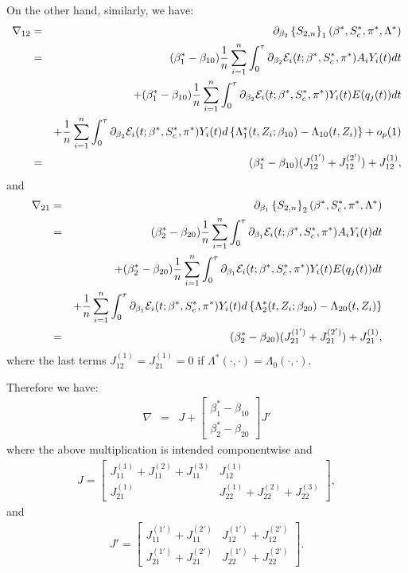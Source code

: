 \documentclass[11pt]{article}
\newcommand{\eqnn}{\begin{eqnarray*}}
\newcommand{\een}{\end{eqnarray*}}
\begin{document}
On the other hand, similarly, we have:
\eqnn
\nabla_{12}&=&\partial_{\beta_2}\left\{{S}_{2,n}\right\}_1({\beta}^{*}, S^{*}_{c},  \pi^{*}, \Lambda^{*})\\
&=&(\beta^{*}_1-\beta_{10})\frac{1}{n}\sum_{i=1}^n\int_0^\tau  \partial_{\beta_2}{\cal E}_i(t; {\beta}^{*}, S^{*}_c,\pi^{*})A_iY_i(t)dt \\
&&+(\beta^{*}_1-\beta_{10})\frac{1}{n}\sum_{i=1}^n\int_0^\tau  \partial_{\beta_2}{\cal E}_i(t; {\beta}^{*}, S^{*}_c,\pi^{*})Y_i(t)E(q_{j}(t))dt\\
&&+\frac{1}{n}\sum_{i=1}^n\int_0^\tau  \partial_{\beta_2}{\cal E}_i(t; {\beta}^{*}, S^{*}_c,\pi^{*})Y_i(t)d\left\{\Lambda_1^{*}(t,Z_i ; \beta_{10})-\Lambda_{10}(t,Z_i)\right\}+o_p(1)\\
&=&(\beta^{*}_1-\beta_{10})(J^{(1')}_{12}+J^{(2')}_{12})+J^{(1)}_{12},\een
and
\eqnn
\nabla_{21}&=&\partial_{\beta_1}\left\{{S}_{2,n}\right\}_2({\beta}^{*}, S^{*}_{c},  \pi^{*}, \Lambda^{*})\\
&=&(\beta^{*}_2-\beta_{20})\frac{1}{n}\sum_{i=1}^n\int_0^\tau  \partial_{\beta_1}{\cal E}_i(t; {\beta}^{*}, S^{*}_c,\pi^{*})A_iY_i(t)dt \\
&&+(\beta^{*}_2-\beta_{20})\frac{1}{n}\sum_{i=1}^n\int_0^\tau  \partial_{\beta_1}{\cal E}_i(t; {\beta}^{*}, S^{*}_c,\pi^{*})Y_i(t)E(q_{j}(t))dt\\
&&+\frac{1}{n}\sum_{i=1}^n\int_0^\tau  \partial_{\beta_1}{\cal E}_i(t; {\beta}^{*}, S^{*}_c,\pi^{*})Y_i(t)d\left\{\Lambda_2^{*}(t,Z_i ; \beta_{20})-\Lambda_{20}(t,Z_i)\right\}\\
&=&(\beta^{*}_2-\beta_{20})(J^{(1')}_{21}+J^{(2')}_{21})+J^{(1)}_{21},\een
where the last terms $J^{(1)}_{12}=J^{(1)}_{21}=0$ if $\Lambda^{*}(\cdot,\cdot)=\Lambda_0(\cdot,\cdot)$.

Therefore we have:
\eqnn
\nabla&=&J+\begin{bmatrix} \beta^{*}_1-\beta_{10} \\ \beta^{*}_2-\beta_{20}\end{bmatrix}J'
\een
where the above multiplication is intended componentwise and
\eqnn
J=\begin{bmatrix} J^{(1)}_{11}+J^{(2)}_{11}+J^{(3)}_{11}& J^{(1)}_{12}\\
J^{(1)}_{21} & J^{(1)}_{22}+J^{(2)}_{22}+J^{(3)}_{22}
\end{bmatrix},
\een
and
\eqnn
J'=\begin{bmatrix} J^{(1')}_{11}+J^{(2')}_{11} & J^{(1')}_{12}+J^{(2')}_{12}\\
J^{(1')}_{21}+J^{(2')}_{21}& J^{(1')}_{22}+J^{(2')}_{22}
\end{bmatrix}.
\een
\end{document}
